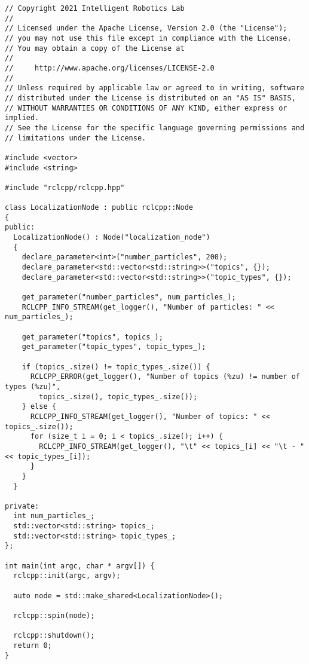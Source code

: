  \footnotesize
\begin{tcolorbox}[sharp corners, colframe=gray!80, colback=LightGray, left=0pt, top=0pt, bottom=0pt, title=\texttt{br2\_basics/src/param\_reader.cpp}]
  \begin{verbatim}
// Copyright 2021 Intelligent Robotics Lab
//
// Licensed under the Apache License, Version 2.0 (the "License");
// you may not use this file except in compliance with the License.
// You may obtain a copy of the License at
//
//     http://www.apache.org/licenses/LICENSE-2.0
//
// Unless required by applicable law or agreed to in writing, software
// distributed under the License is distributed on an "AS IS" BASIS,
// WITHOUT WARRANTIES OR CONDITIONS OF ANY KIND, either express or implied.
// See the License for the specific language governing permissions and
// limitations under the License.

#include <vector>
#include <string>

#include "rclcpp/rclcpp.hpp"

class LocalizationNode : public rclcpp::Node
{
public:
  LocalizationNode() : Node("localization_node")
  {
    declare_parameter<int>("number_particles", 200);
    declare_parameter<std::vector<std::string>>("topics", {});
    declare_parameter<std::vector<std::string>>("topic_types", {});

    get_parameter("number_particles", num_particles_);
    RCLCPP_INFO_STREAM(get_logger(), "Number of particles: " << num_particles_);

    get_parameter("topics", topics_);
    get_parameter("topic_types", topic_types_);

    if (topics_.size() != topic_types_.size()) {
      RCLCPP_ERROR(get_logger(), "Number of topics (%zu) != number of types (%zu)",
        topics_.size(), topic_types_.size());
    } else {
      RCLCPP_INFO_STREAM(get_logger(), "Number of topics: " << topics_.size());
      for (size_t i = 0; i < topics_.size(); i++) {
        RCLCPP_INFO_STREAM(get_logger(), "\t" << topics_[i] << "\t - " << topic_types_[i]);
      }
    }
  }

private:
  int num_particles_;
  std::vector<std::string> topics_;
  std::vector<std::string> topic_types_;
};

int main(int argc, char * argv[]) {
  rclcpp::init(argc, argv);

  auto node = std::make_shared<LocalizationNode>();

  rclcpp::spin(node);

  rclcpp::shutdown();
  return 0;
}
    \end{verbatim}
    \end{tcolorbox}
  \normalsize

